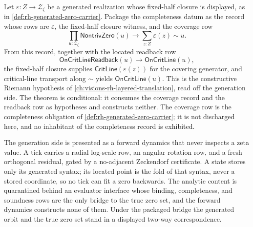 \begin{theorem}
\label{thm:rh-generation-completeness-bridge}
Let $\varepsilon:Z\to\mathcal Z_{\zeta}$ be a generated realization whose
fixed-half closure is displayed, as in \autoref{def:rh-generated-zero-carrier}.
Package the completeness datum as the record whose rows are $\varepsilon$, the
fixed-half closure witness, and the coverage row
$$
\prod_{u:\mathcal Z_{\zeta}}\mathsf{NontrivZero}(u)\to
\sum_{z:Z}\varepsilon(z)\sim u.
$$
From this record, together with the located readback row
$$
\mathsf{OnCritLineReadback}(u)\to\mathsf{OnCritLine}(u),
$$
the fixed-half closure supplies $\mathsf{CritLine}(\varepsilon(z))$ for the
covering generator, and critical-line transport along $\sim$ yields
$\mathsf{OnCritLine}(u)$. This is the constructive Riemann hypothesis of
\autoref{ch:visions-rh-layered-translation}, read off the generation side. The
theorem is conditional: it consumes the coverage record and the readback row as
hypotheses and constructs neither. The coverage row is the completeness
obligation of \autoref{def:rh-generated-zero-carrier}; it is not discharged
here, and no inhabitant of the completeness record is exhibited.
\end{theorem}

\begin{principle}
\label{prin:rh-generation-forward-firewall}
The generation side is presented as a forward dynamics that never inspects a
zeta value. A tick carries a radial log-scale row, an angular rotation row, and
a fresh orthogonal residual, gated by a no-adjacent Zeckendorf certificate. A
state stores only its generated syntax; its located point is the fold of that
syntax, never a stored coordinate, so no tick can fit a zero backwards. The
analytic content is quarantined behind an evaluator interface whose binding,
completeness, and soundness rows are the only bridge to the true zero set, and
the forward dynamics constructs none of them. Under the packaged bridge the
generated orbit and the true zero set stand in a displayed two-way
correspondence.
\end{principle}

